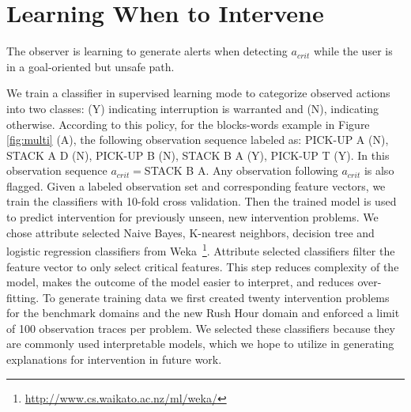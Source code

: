 \documentclass[letterpaper]{article}
\theoremstyle{plain}
\begin{document}
\section{Learning When to Intervene}
The observer is learning to generate alerts when detecting $a_{crit}$ while the user is in a goal-oriented but unsafe path. %

We train a classifier in supervised learning mode to categorize observed actions into two classes: (Y) indicating interruption is warranted and (N), indicating otherwise. According to this policy, for the blocks-words example in Figure \ref{fig:multi} (A), the following observation sequence labeled as: PICK-UP A (N), STACK A D (N), PICK-UP B (N), STACK B A (Y), PICK-UP T (Y). In this observation sequence $a_{crit}=$STACK B A. Any observation following $a_{crit}$ is also flagged. Given a labeled observation set and corresponding feature vectors, we train the classifiers with 10-fold cross validation. Then the trained model is used to predict intervention for previously unseen, new intervention problems. We chose attribute selected Naive Bayes, K-nearest neighbors, decision tree and logistic regression classifiers from Weka~\footnote{\url{http://www.cs.waikato.ac.nz/ml/weka/}}. Attribute selected classifiers filter the feature vector to only select critical features. This step reduces complexity of the model, makes the outcome of the model easier to interpret, and reduces over-fitting. To generate training data we first created twenty intervention problems for the benchmark domains and the new Rush Hour domain and enforced a limit of 100 observation traces per problem. We selected these classifiers because they are commonly used interpretable models, which we hope to utilize in generating explanations for intervention in future work.


 
\end{document}

